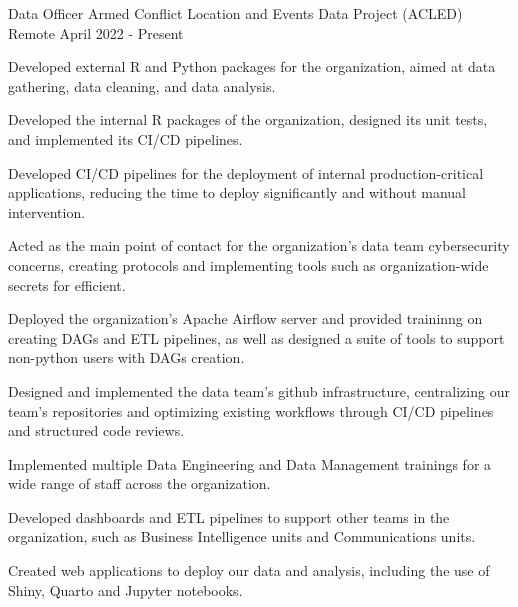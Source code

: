 

\begin{cventries}

  \cventry
    {Data Officer} %
    {Armed Conflict Location and Events Data Project (ACLED)} %
    {Remote} %
    {April 2022 - Present} %
    {
      \begin{cvitems} %
        \item {Developed external R and Python packages for the organization, aimed at data gathering, data cleaning, and data analysis.}
        \item {Developed the internal R packages of the organization, designed its unit tests, and implemented its CI/CD pipelines.} %
        \item {Developed CI/CD pipelines for the deployment of internal production-critical applications, reducing the time to deploy significantly and without manual intervention.}
        \item {Acted as the main point of contact for the organization's data team cybersecurity concerns, creating protocols and implementing tools such as organization-wide secrets for efficient.}
        \item {Deployed the organization's Apache Airflow server and provided traininng on creating DAGs and ETL pipelines, as well as designed a suite of tools to support non-python users with DAGs creation.}
        \item {Designed and implemented the data team's github infrastructure, centralizing our team's repositories and optimizing existing workflows through CI/CD pipelines and structured code reviews.}
        \item {Implemented multiple Data Engineering and Data Management trainings for a wide range of staff across the organization.}
        \item {Developed dashboards and ETL pipelines to support other teams in the organization, such as Business Intelligence units and Communications units.}
        \item {Created web applications to deploy our data and analysis, including the use of Shiny, Quarto and Jupyter notebooks.}

\end{cvitems}}
\end{cventries}
